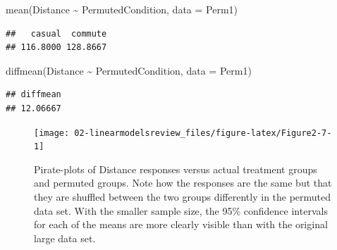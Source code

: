 \documentclass[
]{book}
\newenvironment{Shaded}{\begin{snugshade}}{\end{snugshade}}
\newcommand{\AttributeTok}[1]{\textcolor[rgb]{0.77,0.63,0.00}{#1}}
\newcommand{\FunctionTok}[1]{\textcolor[rgb]{0.00,0.00,0.00}{#1}}
\newcommand{\NormalTok}[1]{#1}
\newcommand{\SpecialCharTok}[1]{\textcolor[rgb]{0.00,0.00,0.00}{#1}}
\begin{document}
\begin{Shaded}
\begin{Highlighting}[]
\FunctionTok{mean}\NormalTok{(Distance }\SpecialCharTok{\textasciitilde{}}\NormalTok{ PermutedCondition, }\AttributeTok{data =}\NormalTok{ Perm1)}
\end{Highlighting}
\end{Shaded}

\begin{verbatim}
##   casual  commute 
## 116.8000 128.8667
\end{verbatim}

\begin{Shaded}
\begin{Highlighting}[]
\FunctionTok{diffmean}\NormalTok{(Distance }\SpecialCharTok{\textasciitilde{}}\NormalTok{ PermutedCondition, }\AttributeTok{data =}\NormalTok{ Perm1)}
\end{Highlighting}
\end{Shaded}

\begin{verbatim}
## diffmean 
## 12.06667
\end{verbatim}



\begin{figure}[t]

{\centering \texttt{[image: 02-linearmodelsreview\_files/figure-latex/Figure2-7-1]} 

}

\caption{Pirate-plots of Distance responses versus actual treatment groups and permuted groups. Note how the responses are the same but that they are shuffled between the two groups differently in the permuted data set. With the smaller sample size, the 95\% confidence intervals for each of the means are more clearly visible than with the original large data set.}\label{fig:Figure2-7}
\end{figure}
\end{document}
